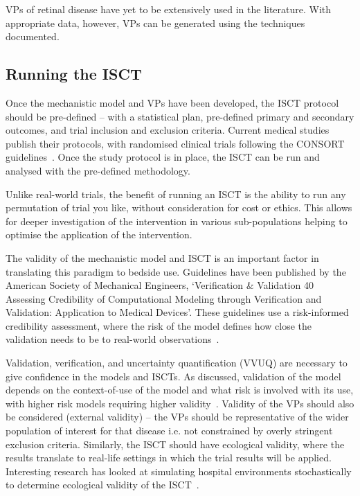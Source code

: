 \documentclass{article}
\begin{document}
VPs of retinal disease have yet to be extensively used in the literature. With appropriate data, however, VPs can be generated using the techniques documented.

\subsection{Running the ISCT}

Once the mechanistic model and VPs have been developed, the ISCT protocol should be pre-defined – with a statistical plan, pre-defined primary and secondary outcomes, and trial inclusion and exclusion criteria. Current medical studies publish their protocols, with randomised clinical trials following the CONSORT guidelines~\cite{Schulz2010}. Once the study protocol is in place, the ISCT can be run and analysed with the pre-defined methodology.

Unlike real-world trials, the benefit of running an ISCT is the ability to run any permutation of trial you like, without consideration for cost or ethics. This allows for deeper investigation of the intervention in various sub-populations helping to optimise the application of the intervention.

The validity of the mechanistic model and ISCT is an important factor in translating this paradigm to bedside use. Guidelines have been published by the American Society of Mechanical Engineers, `Verification \& Validation 40 Assessing Credibility of Computational Modeling through Verification and Validation: Application to Medical Devices'. These guidelines use a risk-informed credibility assessment, where the risk of the model defines how close the validation needs to be to real-world observations~\cite{ASME2018}.

Validation, verification, and uncertainty quantification (VVUQ) are necessary to give confidence in the models and ISCTs. As discussed, validation of the model depends on the context-of-use of the model and what risk is involved with its use, with higher risk models requiring higher validity~\cite{Pappalardo2019}. Validity of the VPs should also be considered (external validity) – the VPs should be representative of the wider population of interest for that disease i.e. not constrained by overly stringent exclusion criteria. Similarly, the ISCT should have ecological validity, where the results translate to real-life settings in which the trial results will be applied. Interesting research has looked at simulating hospital environments stochastically to determine ecological validity of the ISCT~\cite{Fuertinger2018}.
\end{document}
